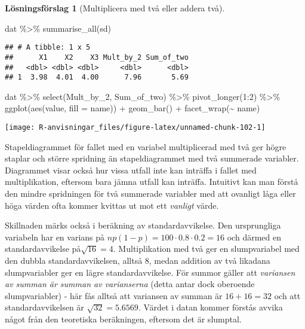 \documentclass[
]{book}
\newenvironment{Shaded}{\begin{snugshade}}{\end{snugshade}}
\newcommand{\AttributeTok}[1]{\textcolor[rgb]{0.77,0.63,0.00}{#1}}
\newcommand{\DecValTok}[1]{\textcolor[rgb]{0.00,0.00,0.81}{#1}}
\newcommand{\FunctionTok}[1]{\textcolor[rgb]{0.00,0.00,0.00}{#1}}
\newcommand{\NormalTok}[1]{#1}
\newcommand{\SpecialCharTok}[1]{\textcolor[rgb]{0.00,0.00,0.00}{#1}}
\theoremstyle{definition}
\theoremstyle{definition}
\theoremstyle{definition}
\theoremstyle{definition}
\newtheorem{hypothesis}{Lösningsförslag}[chapter]
\theoremstyle{remark}
\begin{document}
\begin{hypothesis}[Multiplicera med två eller addera två]
\begin{Shaded}
\begin{Highlighting}[]
\NormalTok{dat }\SpecialCharTok{\%\textgreater{}\%} 
  \FunctionTok{summarise\_all}\NormalTok{(sd)}
\end{Highlighting}
\end{Shaded}

\begin{verbatim}
## # A tibble: 1 x 5
##      X1    X2    X3 Mult_by_2 Sum_of_two
##   <dbl> <dbl> <dbl>     <dbl>      <dbl>
## 1  3.98  4.01  4.00      7.96       5.69
\end{verbatim}

\begin{Shaded}
\begin{Highlighting}[]
\NormalTok{dat }\SpecialCharTok{\%\textgreater{}\%} 
  \FunctionTok{select}\NormalTok{(Mult\_by\_2, Sum\_of\_two) }\SpecialCharTok{\%\textgreater{}\%} 
  \FunctionTok{pivot\_longer}\NormalTok{(}\DecValTok{1}\SpecialCharTok{:}\DecValTok{2}\NormalTok{) }\SpecialCharTok{\%\textgreater{}\%} 
  \FunctionTok{ggplot}\NormalTok{(}\FunctionTok{aes}\NormalTok{(value, }\AttributeTok{fill =}\NormalTok{ name)) }\SpecialCharTok{+}
  \FunctionTok{geom\_bar}\NormalTok{() }\SpecialCharTok{+}
  \FunctionTok{facet\_wrap}\NormalTok{(}\SpecialCharTok{\textasciitilde{}}\NormalTok{ name)}
\end{Highlighting}
\end{Shaded}

\begin{center}\texttt{[image: R-anvisningar\_files/figure-latex/unnamed-chunk-102-1]} \end{center}

Stapeldiagrammet för fallet med en variabel multiplicerad med två ger högre staplar och större spridning än stapeldiagrammet med två summerade variabler. Diagrammet visar också hur vissa utfall inte kan inträffa i fallet med multiplikation, eftersom bara jämna utfall kan inträffa. Intuitivt kan man förstå den mindre spridningen för två summerade variabler med att ovanligt låga eller höga värden ofta kommer kvittas ut mot ett \emph{vanligt} värde.

Skillnaden märks också i beräkning av standardavvikelse. Den ursprungliga variabeln har en varians på \(np(1-p) = 100 \cdot 0.8 \cdot 0.2 = 16\) och därmed en standardavvikelse på\(\sqrt{16} = 4\). Multiplikation med två ger en slumpvariabel med den dubbla standardavvikelsen, alltså 8, medan addition av två likadana slumpvariabler ger en lägre standardavvikelse. För summor gäller att \emph{variansen av summan är summan av varianserna} (detta antar dock oberoende slumpvariabler) - här fås alltså att variansen av summan är \(16+16=32\) och att standardavvikelsen är \(\sqrt{32} = 5.6569\). Värdet i datan kommer förstås avvika något från den teoretiska beräkningen, eftersom det är slumptal.
\end{hypothesis}
\end{document}

